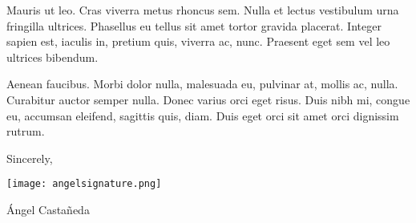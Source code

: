 \documentclass[12pt]{article}
\newcommand{\itemspace}{\vspace{0.5em}}
\begin{document}
\itemspace

Mauris ut leo. Cras viverra metus rhoncus sem. Nulla et lectus vestibulum urna fringilla ultrices. Phasellus eu tellus sit amet tortor gravida placerat. Integer sapien est, iaculis in, pretium quis, viverra ac, nunc. Praesent eget sem vel leo ultrices bibendum.

\itemspace

Aenean faucibus. Morbi dolor nulla, malesuada eu, pulvinar at, mollis ac, nulla. Curabitur auctor semper nulla. Donec varius orci eget risus. Duis nibh mi, congue eu, accumsan eleifend, sagittis quis, diam. Duis eget orci sit amet orci dignissim rutrum.

\vspace{15mm}

\noindent Sincerely,

\noindent
\texttt{[image: angelsignature.png]}

\noindent Ángel Castañeda
\end{document}
